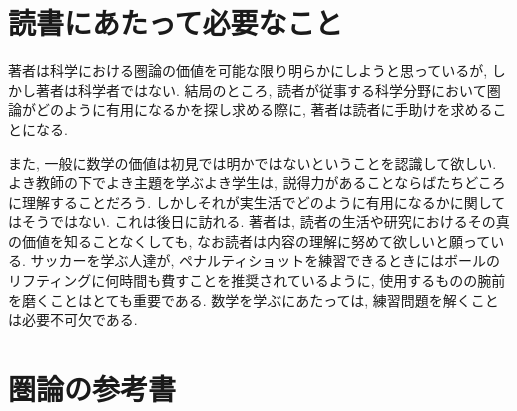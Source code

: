 \section{読書にあたって必要なこと}


著者は科学における圏論の価値を可能な限り明らかにしようと思っているが, しかし著者は科学者ではない. 結局のところ, 読者が従事する科学分野において圏論がどのように有用になるかを探し求める際に, 著者は読者に手助けを求めることになる. 


また, 一般に数学の価値は初見では明かではないということを認識して欲しい. よき教師の下でよき主題を学ぶよき学生は, 説得力があることならばたちどころに理解することだろう. しかしそれが実生活でどのように有用になるかに関してはそうではない. これは後日に訪れる. 著者は, 読者の生活や研究におけるその真の価値を知ることなくしても, なお読者は内容の理解に努めて欲しいと願っている. サッカーを学ぶ人達が, ペナルティショットを練習できるときにはボールのリフティングに何時間も費すことを推奨されているように, 使用するものの腕前を磨くことはとても重要である. 数学を学ぶにあたっては, 練習問題を解くことは必要不可欠である.


\section{圏論の参考書}


